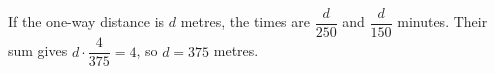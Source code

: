 If the one-way distance is $d$ metres, the times are $\dfrac{d}{250}$ and $\dfrac{d}{150}$ minutes. Their sum gives $d\cdot\dfrac{4}{375}=4$, so $\boxed{d=375}$ metres.
